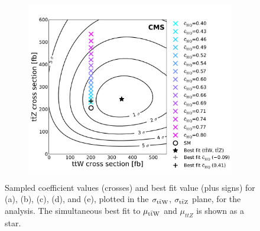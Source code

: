 \begin{figure}
  \begin{subfigure}{0.5\textwidth}
    \includegraphics[width=\textwidth]{figures/eight-TeV/NP/operator_points_color_cycled_cHQ_ttZ_ttW_2d_v4_mod_print}
    \caption{}
  \end{subfigure}
  \vspace{-1cm}
  \caption[Best fit values in the $\sigma_{\ttW}$, $\sigma_{\ttZ}$ plane (\eightTeV)]{Sampled coefficient values (crosses) and best fit value (plus signs) for \cuB (a), \cthreeW (b), \cpHQ (c), \cHu (d), and \cHQ (e), plotted in the $\sigma_{\ttW}$, $\sigma_{\ttZ}$ plane, for the \eightTeV analysis. The simultaneous best fit to $\mu_{\text{t}\bar{\text{t}}\text{W}}$ and $\mu_{ttZ}$ is shown as a star.}
  \label{fig:8-2d}
\end{figure}

